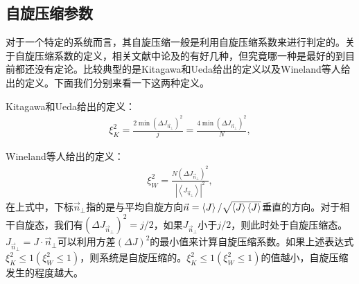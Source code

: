 \subsection{自旋压缩参数}

对于一个特定的系统而言，其自旋压缩一般是利用自旋压缩系数来进行判定的。关于自旋压缩系数的定义，相关文献\cite{MA201189}中论及的有好几种，但究竟哪一种是最好的到目前都还没有定论。比较典型的是Kitagawa和Ueda给出的定义以及Wineland等人给出的定义。下面我们分别来看一下这两种定义。

Kitagawa和Ueda给出的定义：
\begin{align}
	\xi _K^2 = \frac{{2\min {{\left( {\Delta {J_{{{\vec n}_ \bot }}}} \right)}^2}}}{j} = \frac{{4\min {{\left( {\Delta {J_{{{\vec n}_ \bot }}}} \right)}^2}}}{N},\label{eq3326}
\end{align}

Wineland等人给出的定义：
\begin{align}
	\xi _W^2 = \frac{{N{{\left( {\Delta {J_{{{\vec n}_ \bot }}}} \right)}^2}}}{{{{\left| {\left\langle {{J_{{{\vec n}_ \bot }}}} \right\rangle } \right|}^2}}},\label{eq3327}
\end{align}
在上式中，下标${\vec n_ \bot }$指的是与平均自旋方向$\vec n=\braket{J}/\sqrt{\braket{J}\braket{J}}$垂直的方向。对于相干自旋态，我们有$(\Delta {J_{{\vec n}_ \bot} })^2=j/2$，如果$J_{{\vec n}_ \bot} $小于$j/2$，则此时处于自旋压缩态。 ${J_{{{\vec n}_ \bot }}}=J \cdot {\vec n_ \bot }$可以利用方差${\left( {\Delta J} \right)^2}$的最小值来计算自旋压缩系数。如果上述表达式$\xi _K^2 \le 1\left( {\xi _W^2 \le 1} \right)$，则系统是自旋压缩的。$\xi _K^2 \le 1\left( {\xi _W^2 \le 1} \right)$的值越小，自旋压缩发生的程度越大。


